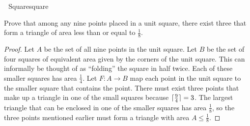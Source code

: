     \begin{example}{\Difficulty\,\Difficulty\,\Difficulty\,\,Square}{square}
    
        Prove that among any nine points placed in a unit square, there exist three that form a triangle of area less than or equal to \(\frac{1}{8}\).
        \begin{proof}
            Let \(A\) be the set of all nine points in the unit square. Let \(B\) be the set of four squares of equivalent area given by the corners of the unit square. This can informally be thought of as ``folding'' the square in half twice. Each of these smaller squares has area \(\frac{1}{4}\). Let \(F:A\to B\) map each point in the unit square to the smaller square that contains the point. There must exist three points that make up a triangle in one of the small squares because \(\lceil\frac{9}{4}\rceil=3\). The largest triangle that can be enclosed in one of the smaller squares has area \(\frac{1}{8}\), so the three points mentioned earlier must form a triangle with area \(A\leq\frac{1}{8}\).
        \end{proof}
    
    \end{example}